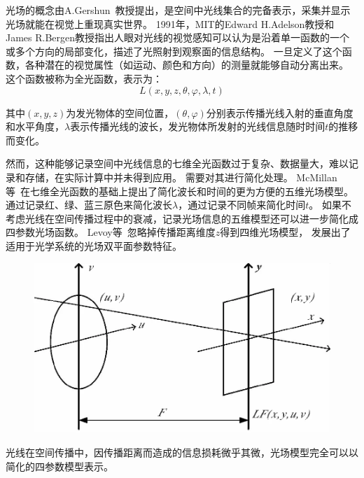 
\label{chap:part2}


光场的概念由A.Gershun~\cite{gershun1939light}教授提出，是空间中光线集合的完备表示，采集并显示光场就能在视觉上重现真实世界。
1991年，MIT的Edward H.Adelson教授和James R.Bergen\cite{adelson1991plenoptic}教授指出人眼对光线的视觉感知可以认为是沿着单一函数的一个或多个方向的局部变化，描述了光照射到观察面的信息结构。
一旦定义了这个函数，各种潜在的视觉属性（如运动、颜色和方向）的测量就能够自动分离出来。
这个函数被称为全光函数，表示为：
\begin{equation}
	L(x,y,z,\theta,\varphi,\lambda,t)
\end{equation}\par
其中$(x,y,z)$为发光物体的空间位置，$(\theta,\varphi)$分别表示传播光线入射的垂直角度和水平角度，$\lambda$表示传播光线的波长，发光物体所发射的光线信息随时时间$t$的推移而变化。


然而，这种能够记录空间中光线信息的七维全光函数过于复杂、数据量大，难以记录和存储，在实际计算中并未得到应用。
需要对其进行简化处理。
McMillan等~\cite{mcmillan2023plenoptic}在七维全光函数的基础上提出了简化波长和时间的更为方便的五维光场模型。
通过记录红、绿、蓝三原色来简化波长$\lambda$，通过记录不同帧来简化时间$t$。
如果不考虑光线在空间传播过程中的衰减，记录光场信息的五维模型还可以进一步简化成四参数光场函数。
Levoy等~\cite{levoy2023light}忽略掉传播距离维度$z$得到四维光场模型，
发展出了适用于光学系统的光场双平面参数特征。
\begin{figure}[!ht]
	\centering
	\includegraphics[width=0.78\linewidth]{figures/chapter2/double-plane2}
	\label{chapter2_fig1:double_plane}
\end{figure}
光线在空间传播中，因传播距离而造成的信息损耗微乎其微，光场模型完全可以以简化的四参数模型表示。




